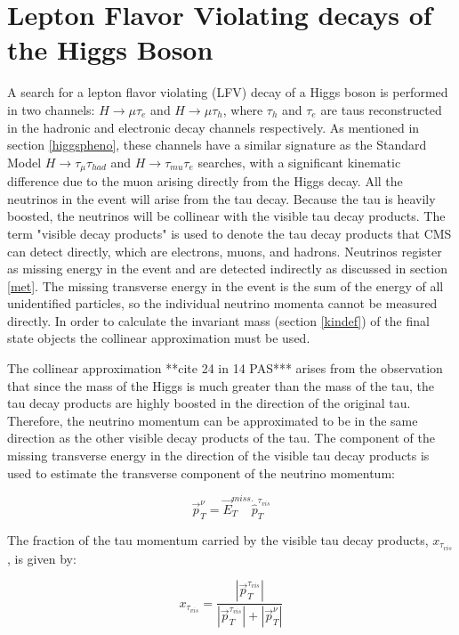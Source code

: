 \documentclass[oneside, letterpaper, oldfontcommands]{memoir}
\begin{document}
\chapter{Lepton Flavor Violating decays of the Higgs Boson}\label{lfv}
\qquad A search for a lepton flavor violating (LFV) decay of a Higgs boson is performed in two channels: $H \rightarrow \mu\tau_{e}$ and $H \rightarrow \mu\tau_{h}$, where $\tau_{h}$ and $\tau_{e}$ are taus reconstructed in the hadronic and electronic decay channels respectively. As mentioned in section \ref{higgspheno}, these channels have a similar signature as the Standard Model $H \rightarrow \tau_{\mu} \tau_{had}$ and $H \rightarrow \tau_{mu}\tau_{e}$ searches, with a significant kinematic difference due to the muon arising directly from the Higgs decay. All the neutrinos in the event will arise from the tau decay. Because the tau is heavily boosted, the neutrinos will be collinear with the visible tau decay products. The term "visible decay products" is used to denote the tau decay products that CMS can detect directly, which are electrons, muons, and hadrons. Neutrinos register as missing energy in the event and are detected indirectly as discussed in section \ref{met}. The missing transverse energy in the event is the sum of the energy of all unidentified particles, so the individual neutrino momenta cannot be measured directly. In order to calculate the invariant mass (section \ref{kindef}) of the final state objects the collinear approximation must be used.

\qquad The collinear approximation **cite 24 in 14 PAS*** arises from the observation that since the mass of the Higgs is much greater than the mass of the tau, the tau decay products are highly boosted in the direction of the original tau. Therefore, the neutrino momentum can be approximated to be in the same direction as the other visible decay products of the tau. The component of the missing transverse energy in the direction of the visible tau decay products is used to estimate the transverse component of the neutrino momentum:

\begin{equation}
\vec{p}_{T}^{\nu} = \vec{E}_{T}^{miss} \dot \hat{p}_{T}^{\tau_{vis}}
\end{equation}

The fraction of the tau momentum carried by the visible tau decay products, $x_{\tau_{vis}}$, is given by:

\begin{equation}
x_{\tau_{vis}} = \frac{|\vec{p}_{T}^{\tau_{vis}}|}{|\vec{p}_{T}^{\tau_{vis}}| + |\vec{p}_{T}^{\nu}|}
\end{equation}
\end{document}
